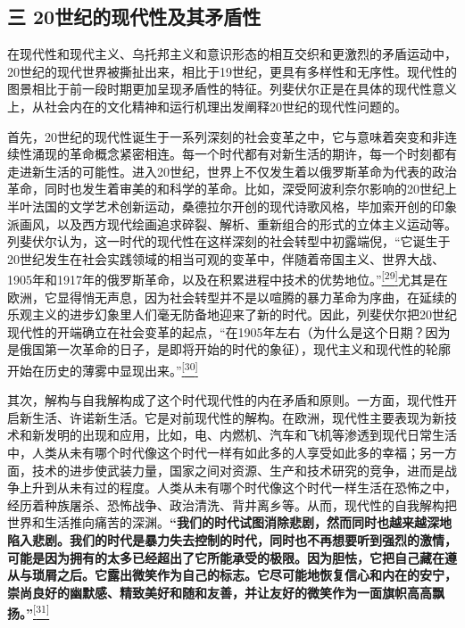 \documentclass[UTF8, fontset = sourcesans, a4paper, oneside, zihao =
-4, scheme=chinese, no-math, space=true]{ctexbook}
\begin{document}
\subsection{三
20世纪的现代性及其矛盾性}\label{part0005_split_002.htmlux5cux23c008}

在现代性和现代主义、乌托邦主义和意识形态的相互交织和更激烈的矛盾运动中，20世纪的现代世界被撕扯出来，相比于19世纪，更具有多样性和无序性。现代性的图景相比于前一段时期更加呈现矛盾性的特征。列斐伏尔正是在具体的现代性意义上，从社会内在的文化精神和运行机理出发阐释20世纪的现代性问题的。

首先，20世纪的现代性诞生于一系列深刻的社会变革之中，它与意味着突变和非连续性涌现的革命概念紧密相连。每一个时代都有对新生活的期许，每一个时刻都有走进新生活的可能性。进入20世纪，世界上不仅发生着以俄罗斯革命为代表的政治革命，同时也发生着审美的和科学的革命。比如，深受阿波利奈尔影响的20世纪上半叶法国的文学艺术创新运动，桑德拉尔开创的现代诗歌风格，毕加索开创的印象派画风，以及西方现代绘画追求碎裂、解析、重新组合的形式的立体主义运动等。列斐伏尔认为，这一时代的现代性在这样深刻的社会转型中初露端倪，``它诞生于20世纪发生在社会实践领域的相当可观的变革中，伴随着帝国主义、世界大战、1905年和1917年的俄罗斯革命，以及在积累进程中技术的优势地位。''\protect\hypertarget{part0005_split_002.htmlux5cux23w29}{}{}\protect\hyperlink{part0005_split_003.htmlux5cux23m29}{\textsuperscript{{[}29{]}}}尤其是在欧洲，它显得悄无声息，因为社会转型并不是以喧腾的暴力革命为序曲，在延续的乐观主义的进步幻象里人们毫无防备地迎来了新的时代。因此，列斐伏尔把20世纪现代性的开端确立在社会变革的起点，``在1905年左右（为什么是这个日期？因为是俄国第一次革命的日子，是即将开始的时代的象征），现代主义和现代性的轮廓开始在历史的薄雾中显现出来。''\protect\hypertarget{part0005_split_002.htmlux5cux23w30}{}{}\protect\hyperlink{part0005_split_003.htmlux5cux23m30}{\textsuperscript{{[}30{]}}}

其次，解构与自我解构成了这个时代现代性的内在矛盾和原则。一方面，现代性开启新生活、许诺新生活。它是对前现代性的解构。在欧洲，现代性主要表现为新技术和新发明的出现和应用，比如，电、内燃机、汽车和飞机等渗透到现代日常生活中，人类从未有哪个时代像这个时代一样有如此多的人享受如此多的幸福；另一方面，技术的进步使武装力量，国家之间对资源、生产和技术研究的竞争，进而是战争上升到从未有过的程度。人类从未有哪个时代像这个时代一样生活在恐怖之中，经历着种族屠杀、恐怖战争、政治清洗、背井离乡等。从而，现代性的自我解构把世界和生活推向痛苦的深渊。\textbf{``我们的时代试图消除悲剧，然而同时也越来越深地陷入悲剧。我们的时代是暴力失去控制的时代，同时也不再想要听到强烈的激情，可能是因为拥有的太多已经超出了它所能承受的极限。因为胆怯，它把自己藏在遵从与琐屑之后。它露出微笑作为自己的标志。它尽可能地恢复信心和内在的安宁，崇尚良好的幽默感、精致美好和随和友善，并让友好的微笑作为一面旗帜高高飘扬。''}\protect\hypertarget{part0005_split_002.htmlux5cux23w31}{}{}\protect\hyperlink{part0005_split_003.htmlux5cux23m31}{\textsuperscript{{[}31{]}}}
\end{document}
